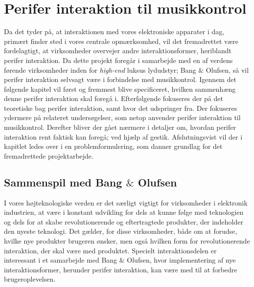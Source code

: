 \chapter{Perifer interaktion til musikkontrol}
\label{PeriferInteraktionTilMusikKontrol}
%
Da det tyder på, at interaktionen med vores elektroniske apparater i dag, primært finder sted i vores centrale opmærksomhed, vil det fremadrettet være fordelagtigt, at virksomheder overvejer andre interaktionsformer, heriblandt perifer interaktion. Da dette projekt foregår i samarbejde med en af verdens førende virksomheder inden for \textit{high-end} luksus lydudstyr; Bang $\&$ Olufsen, så vil perifer interaktion selvsagt være i forbindelse med musikkontrol. Igennem det følgende kapitel vil først og fremmest blive specificeret, hvilken sammenhæng denne perifer interaktion skal foregå i. Efterfølgende fokuseres der på det teoretiske bag perifer interaktion, samt hvor det udspringer fra. Der fokuseres ydermere på relateret undersøgelser, som netop anvender perifer interaktion til musikkontrol. Derefter bliver der gået nærmere i detaljer om, hvordan perifer interaktion rent faktisk kan foregå; ved hjælp af gestik. Afslutningsvist vil der i kapitlet ledes over i en problemformulering, som danner grundlag for det fremadrettede projektarbejde.    
%
\section{Sammenspil med Bang $\&$ Olufsen}
\label{SammenspilMedBO}
%
I vores højteknologiske verden er det særligt vigtigt for virksomheder i elektronik industrien, at være i konstant udvikling for dels at kunne følge med teknologien og dels for at skabe revolutionerende og eftertragtede produkter, der indeholder den nyeste teknologi. Det gælder, for disse virksomheder, både om at forudse, hvilke nye produkter brugeren ønsker, men også hvilken form for revolutionerende interaktion, der skal være med produktet. Specielt interaktionsdelen er interessant i et samarbejde med Bang $\&$ Olufsen, hvor implementering af nye interaktionsformer, herunder perifer interaktion, kan være med til at forbedre brugeroplevelsen.

